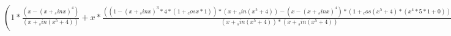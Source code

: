 \documentclass{proc}
\begin{document}
$ {( { {  1  } * \frac{{( {  x  } - { {( {  x  } + {  _sin {  x  } } )} ^ {  4  } } )}}{{( {  x  } + {  _sin {( { {  x  } ^ {  5  } } + {  4  } )} } )} } } + { {  x  } * \frac{{( { {( {  1  } - { { { {( {  x  } + {  _sin {  x  } } )} ^ {  3  } } * {  4  } } * {( {  1  } + { {  _cos {  x  } } * {  1  } } )} } )} * {( {  x  } + {  _sin {( { {  x  } ^ {  5  } } + {  4  } )} } )} } - { {( {  x  } - { {( {  x  } + {  _sin {  x  } } )} ^ {  4  } } )} * {( {  1  } + { {  _cos {( { {  x  } ^ {  5  } } + {  4  } )} } * {( { { { {  x  } ^ {  4  } } * {  5  } } * {  1  } } + {  0  } )} } )} } )}}{{ {( {  x  } + {  _sin {( { {  x  } ^ {  5  } } + {  4  } )} } )} * {( {  x  } + {  _sin {( { {  x  } ^ {  5  } } + {  4  } )} } )} } } } )} $
\end{document}
